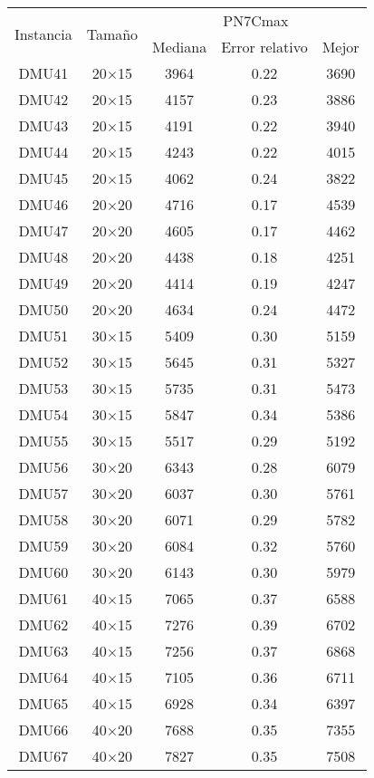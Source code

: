 \begin{table}[H]
\centering
\begin{tabular}{@{}ccccc@{}}
\toprule
\multirow{2}{*}{Instancia} & \multirow{2}{*}{Tamaño} & \multicolumn{3}{c}{ PN7Cmax} \\ \cmidrule(lr){3-5}
& & Mediana& Error relativo & Mejor  \\ \midrule
DMU41 & 20$\times$15 & 3964 & 0.22 & 3690\\ 
DMU42 & 20$\times$15 & 4157 & 0.23 & 3886\\ 
DMU43 & 20$\times$15 & 4191 & 0.22 & 3940\\ 
DMU44 & 20$\times$15 & 4243 & 0.22 & 4015\\ 
DMU45 & 20$\times$15 & 4062 & 0.24 & 3822\\ 
DMU46 & 20$\times$20 & 4716 & 0.17 & 4539\\ 
DMU47 & 20$\times$20 & 4605 & 0.17 & 4462\\ 
DMU48 & 20$\times$20 & 4438 & 0.18 & 4251\\ 
DMU49 & 20$\times$20 & 4414 & 0.19 & 4247\\ 
DMU50 & 20$\times$20 & 4634 & 0.24 & 4472\\ 
DMU51 & 30$\times$15 & 5409 & 0.30 & 5159\\ 
DMU52 & 30$\times$15 & 5645 & 0.31 & 5327\\ 
DMU53 & 30$\times$15 & 5735 & 0.31 & 5473\\ 
DMU54 & 30$\times$15 & 5847 & 0.34 & 5386\\ 
DMU55 & 30$\times$15 & 5517 & 0.29 & 5192\\ 
DMU56 & 30$\times$20 & 6343 & 0.28 & 6079\\ 
DMU57 & 30$\times$20 & 6037 & 0.30 & 5761\\ 
DMU58 & 30$\times$20 & 6071 & 0.29 & 5782\\ 
DMU59 & 30$\times$20 & 6084 & 0.32 & 5760\\ 
DMU60 & 30$\times$20 & 6143 & 0.30 & 5979\\ 
DMU61 & 40$\times$15 & 7065 & 0.37 & 6588\\ 
DMU62 & 40$\times$15 & 7276 & 0.39 & 6702\\ 
DMU63 & 40$\times$15 & 7256 & 0.37 & 6868\\ 
DMU64 & 40$\times$15 & 7105 & 0.36 & 6711\\ 
DMU65 & 40$\times$15 & 6928 & 0.34 & 6397\\ 
DMU66 & 40$\times$20 & 7688 & 0.35 & 7355\\ 
DMU67 & 40$\times$20 & 7827 & 0.35 & 7508\\ 

\end{tabular}
\end{table}
